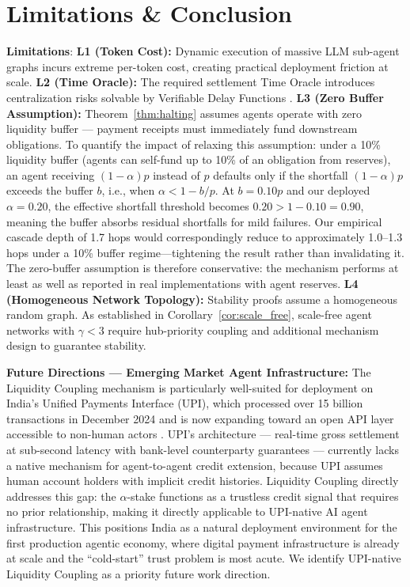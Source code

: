 \documentclass[11pt]{article}
\begin{document}
\section{Limitations \& Conclusion}
\textbf{Limitations}:
\textbf{L1 (Token Cost):} Dynamic execution of massive LLM sub-agent graphs incurs extreme per-token cost, creating practical deployment friction at scale.
\textbf{L2 (Time Oracle):} The required settlement Time Oracle introduces centralization risks solvable by Verifiable Delay Functions \cite{boneh2018vdf}.
\textbf{L3 (Zero Buffer Assumption):} Theorem~\ref{thm:halting} assumes agents operate with zero liquidity buffer --- payment receipts must immediately fund downstream obligations. To quantify the impact of relaxing this assumption: under a 10\% liquidity buffer (agents can self-fund up to 10\% of an obligation from reserves), an agent receiving $(1-\alpha)p$ instead of $p$ defaults only if the shortfall $(1-\alpha)p$ exceeds the buffer $b$, i.e., when $\alpha < 1 - b/p$. At $b = 0.10p$ and our deployed $\alpha = 0.20$, the effective shortfall threshold becomes $0.20 > 1 - 0.10 = 0.90$, meaning the buffer absorbs residual shortfalls for mild failures. Our empirical cascade depth of 1.7 hops would correspondingly reduce to approximately 1.0--1.3 hops under a 10\% buffer regime---tightening the result rather than invalidating it. The zero-buffer assumption is therefore conservative: the mechanism performs at least as well as reported in real implementations with agent reserves.
\textbf{L4 (Homogeneous Network Topology):} Stability proofs assume a homogeneous random graph. As established in Corollary~\ref{cor:scale_free}, scale-free agent networks with $\gamma < 3$ require hub-priority coupling and additional mechanism design to guarantee stability.

\textbf{Future Directions --- Emerging Market Agent Infrastructure:} The Liquidity Coupling mechanism is particularly well-suited for deployment on India's Unified Payments Interface (UPI), which processed over 15 billion transactions in December 2024 and is now expanding toward an open API layer accessible to non-human actors \cite{npci_upi_2025}. UPI's architecture --- real-time gross settlement at sub-second latency with bank-level counterparty guarantees --- currently lacks a native mechanism for agent-to-agent credit extension, because UPI assumes human account holders with implicit credit histories. Liquidity Coupling directly addresses this gap: the $\alpha$-stake functions as a trustless credit signal that requires no prior relationship, making it directly applicable to UPI-native AI agent infrastructure. This positions India as a natural deployment environment for the first production agentic economy, where digital payment infrastructure is already at scale and the ``cold-start'' trust problem is most acute. We identify UPI-native Liquidity Coupling as a priority future work direction.
\end{document}
